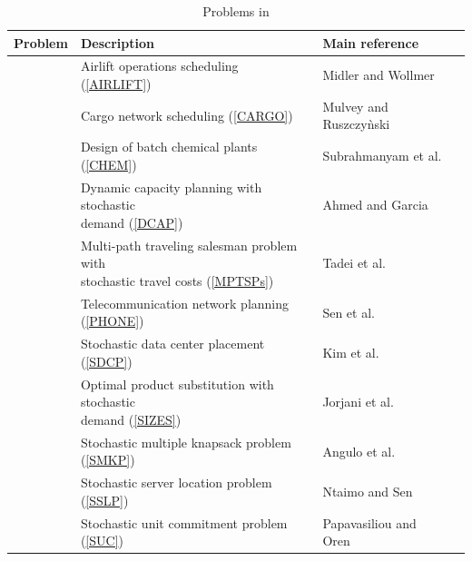 	
\begin{table}[H]
	\centering
			\caption{Problems in \siplibtwo}
			\label{table:problems}
			\begin{tabular}{@{}llll@{}}
				\toprule
				Problem		  		  & Description                                                        & Main reference              \\ \midrule
				\airlift\ & Airlift operations scheduling (\ref{AIRLIFT}) & Midler and Wollmer \cite{journal:MW1969} \\
				\cargo\ & Cargo network scheduling (\ref{CARGO}) & Mulvey and Ruszczy\`{n}ski \cite{journal:MR1995}\\
				\chem\ & Design of batch chemical plants (\ref{CHEM}) & Subrahmanyam et al. \cite{journal:SPR1994}\\				
				\dcap\         & \makecell[tl]{Dynamic capacity planning with stochastic\\ demand (\ref{DCAP}) }                  & Ahmed and Garcia \cite{journal:AG2004}                          \\
				\mptsps\       & \makecell[tl]{Multi-path traveling salesman problem with\\ stochastic travel costs (\ref{MPTSPs})}& Tadei et al. \cite{journal:TPP2017}                            \\
				\phone\       & Telecommunication network planning (\ref{PHONE})& Sen et al. \cite{journal:SDC1994}                            \\
				\sdcp\ 	& Stochastic data center placement (\ref{SDCP}) & Kim et al. \cite{journal:KYZC2017}\\
				\sizes\        & \makecell[tl]{Optimal product substitution with stochastic\\ demand (\ref{SIZES})}         & Jorjani et al. \cite{journal:JSW1999}          \\
				\smkp\		  & Stochastic multiple knapsack problem (\ref{SMKP})                              & Angulo et al. \cite{journal:AAD2014}                            \\
				\sslp\         & Stochastic server location problem (\ref{SSLP})                                & Ntaimo and Sen \cite{journal:NS2005}                           \\
				\suc\         & Stochastic unit commitment problem	(\ref{SUC})			               & Papavasiliou and Oren \cite{journal:PO2013}                       \\ \bottomrule
			\end{tabular}%
			
\end{table}

